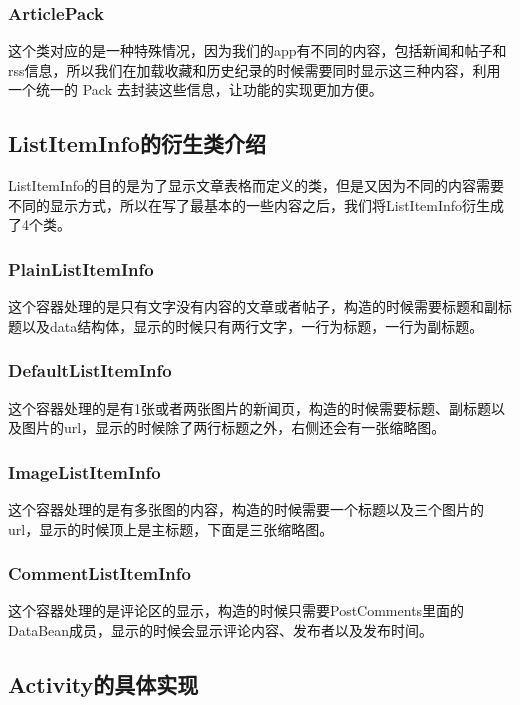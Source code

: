 \subsubsection{ArticlePack}

这个类对应的是一种特殊情况，因为我们的app有不同的内容，包括新闻和帖子和rss信息，所以我们在加载收藏和历史纪录的时候需要同时显示这三种内容，利用一个统一的 Pack 去封装这些信息，让功能的实现更加方便。

\subsection{ListItemInfo的衍生类介绍}

ListItemInfo的目的是为了显示文章表格而定义的类，但是又因为不同的内容需要不同的显示方式，所以在写了最基本的一些内容之后，我们将ListItemInfo衍生成了4个类。

\subsubsection{PlainListItemInfo}

这个容器处理的是只有文字没有内容的文章或者帖子，构造的时候需要标题和副标题以及data结构体，显示的时候只有两行文字，一行为标题，一行为副标题。

\subsubsection{DefaultListItemInfo}

这个容器处理的是有1张或者两张图片的新闻页，构造的时候需要标题、副标题以及图片的url，显示的时候除了两行标题之外，右侧还会有一张缩略图。

\subsubsection{ImageListItemInfo}

这个容器处理的是有多张图的内容，构造的时候需要一个标题以及三个图片的url，显示的时候顶上是主标题，下面是三张缩略图。

\subsubsection{CommentListItemInfo}

这个容器处理的是评论区的显示，构造的时候只需要PostComments里面的DataBean成员，显示的时候会显示评论内容、发布者以及发布时间。

\subsection{Activity的具体实现}


